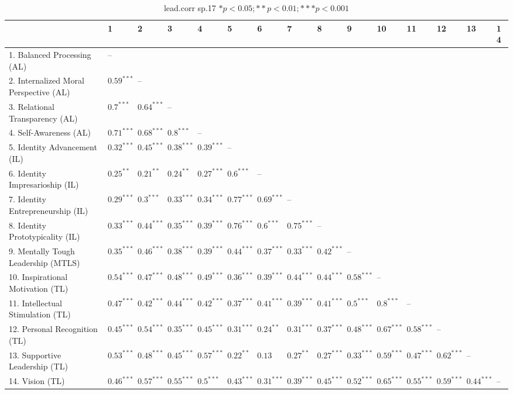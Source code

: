 \begin{table}[ht]
\centering
\begin{tabular}{lllllllllllllll}
  \hline
 & 1 & 2 & 3 & 4 & 5 & 6 & 7 & 8 & 9 & 10 & 11 & 12 & 13 & 14 \\ 
  \hline
1. Balanced Processing (AL) & -- &  &  &  &  &  &  &  &  &  &  &  &  &  \\ 
  2. Internalized Moral Perspective (AL) & $0.59^{***}$ & -- &  &  &  &  &  &  &  &  &  &  &  &  \\ 
  3. Relational Transparency (AL) & $0.7^{***}$ & $0.64^{***}$ & -- &  &  &  &  &  &  &  &  &  &  &  \\ 
  4. Self-Awareness (AL) & $0.71^{***}$ & $0.68^{***}$ & $0.8^{***}$ & -- &  &  &  &  &  &  &  &  &  &  \\ 
  5. Identity Advancement (IL) & $0.32^{***}$ & $0.45^{***}$ & $0.38^{***}$ & $0.39^{***}$ & -- &  &  &  &  &  &  &  &  &  \\ 
  6. Identity Impresarioship (IL) & $0.25^{**}$ & $0.21^{**}$ & $0.24^{**}$ & $0.27^{***}$ & $0.6^{***}$ & -- &  &  &  &  &  &  &  &  \\ 
  7. Identity Entrepreneurship (IL) & $0.29^{***}$ & $0.3^{***}$ & $0.33^{***}$ & $0.34^{***}$ & $0.77^{***}$ & $0.69^{***}$ & -- &  &  &  &  &  &  &  \\ 
  8. Identity Prototypicality (IL) & $0.33^{***}$ & $0.44^{***}$ & $0.35^{***}$ & $0.39^{***}$ & $0.76^{***}$ & $0.6^{***}$ & $0.75^{***}$ & -- &  &  &  &  &  &  \\ 
  9. Mentally Tough Leadership (MTLS) & $0.35^{***}$ & $0.46^{***}$ & $0.38^{***}$ & $0.39^{***}$ & $0.44^{***}$ & $0.37^{***}$ & $0.33^{***}$ & $0.42^{***}$ & -- &  &  &  &  &  \\ 
  10. Inspirational Motivation (TL) & $0.54^{***}$ & $0.47^{***}$ & $0.48^{***}$ & $0.49^{***}$ & $0.36^{***}$ & $0.39^{***}$ & $0.44^{***}$ & $0.44^{***}$ & $0.58^{***}$ & -- &  &  &  &  \\ 
  11. Intellectual Stimulation (TL) & $0.47^{***}$ & $0.42^{***}$ & $0.44^{***}$ & $0.42^{***}$ & $0.37^{***}$ & $0.41^{***}$ & $0.39^{***}$ & $0.41^{***}$ & $0.5^{***}$ & $0.8^{***}$ & -- &  &  &  \\ 
  12. Personal Recognition (TL) & $0.45^{***}$ & $0.54^{***}$ & $0.35^{***}$ & $0.45^{***}$ & $0.31^{***}$ & $0.24^{**}$ & $0.31^{***}$ & $0.37^{***}$ & $0.48^{***}$ & $0.67^{***}$ & $0.58^{***}$ & -- &  &  \\ 
  13. Supportive Leadership (TL) & $0.53^{***}$ & $0.48^{***}$ & $0.45^{***}$ & $0.57^{***}$ & $0.22^{**}$ & $0.13$ & $0.27^{**}$ & $0.27^{***}$ & $0.33^{***}$ & $0.59^{***}$ & $0.47^{***}$ & $0.62^{***}$ & -- &  \\ 
  14. Vision (TL) & $0.46^{***}$ & $0.57^{***}$ & $0.55^{***}$ & $0.5^{***}$ & $0.43^{***}$ & $0.31^{***}$ & $0.39^{***}$ & $0.45^{***}$ & $0.52^{***}$ & $0.65^{***}$ & $0.55^{***}$ & $0.59^{***}$ & $0.44^{***}$ & -- \\ 
   \hline
\end{tabular}
\caption{lead.corr sp.17 $* p < 0.05; ** p < 0.01; *** p < 0.001$} 
\label{freq_corr.lead.corr.sp.17}
\end{table}

